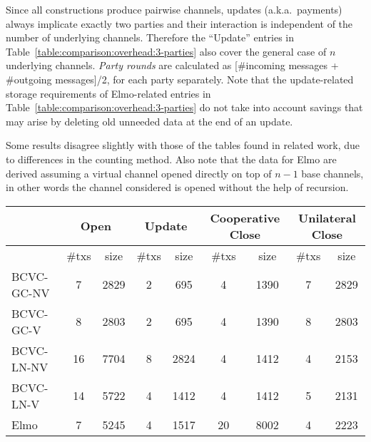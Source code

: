   Since all constructions produce pairwise channels, updates (a.k.a.\ payments)
  always implicate exactly two parties and
  their interaction is independent of the number of underlying channels.
  Therefore the ``Update'' entries in
  Table~\ref{table:comparison:overhead:3-parties} also cover the general case of
  $n$ underlying channels. \emph{Party rounds} are calculated as
  [\#incoming messages + \#outgoing messages]/2, for each party
  separately. Note that the update-related storage requirements of Elmo-related
  entries in Table~\ref{table:comparison:overhead:3-parties} do not take into
  account savings that may arise by deleting old unneeded data at the end of an
  update.

  Some results disagree slightly with those of the tables found in related work,
  due to differences in the counting method. Also note that the data for Elmo
  are derived assuming a virtual channel opened directly on top of $n-1$ base
  channels, in other words the channel considered is opened without the help of
  recursion.

  \begin{table*}
    \begin{minipage}{\textwidth}
    \begin{center}
    \begin{tabular}{|l|c|c|c|c|c|c|c|c|}
    \hline
              & \multicolumn{2}{|c|}{Open}
              & \multicolumn{2}{|c|}{Update}
              & \multicolumn{2}{|c|}{Cooperative Close}
              & \multicolumn{2}{|c|}{Unilateral Close} \\
    \hline
              & \#txs & size & \#txs & size & \#txs & size & \#txs & size \\
    \hline
    BCVC-GC-NV
              & 7 & 2829 & 2 & 695 & 4 & 1390 & 7 & 2829 \\
    \hline
    BCVC-GC-V & 8 & 2803 & 2 & 695 & 4 & 1390 & 8 & 2803 \\
    \hline
    BCVC-LN-NV
              & 16 & 7704 & 8 & 2824 & 4 & 1412 & 4 & 2153 \\
    \hline
    BCVC-LN-V & 14 & 5722 & 4 & 1412 & 4 & 1412 & 5 & 2131 \\
    \hline
    Elmo      & 7 & 5245 & 4 & 1517 & 20 & 8002 & 4 & 2223 \\
    \hline
    \end{tabular}
    \end{center}
    \end{minipage}
    \caption{Efficiency comparison of a $3$-party channel in Elmo and
    BCVC~\cite{cryptoeprint:2020:554}}
    \label{table:comparison:overhead:3-parties}
  \end{table*}

